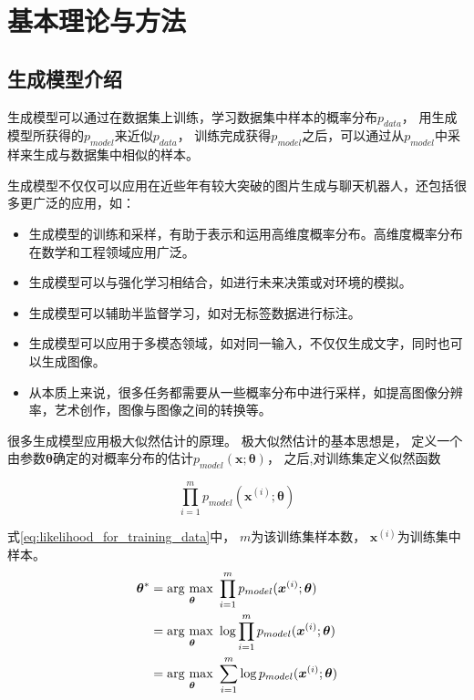 \chapter{基本理论与方法}




\section{生成模型介绍}
生成模型可以通过在数据集上训练，学习数据集中样本的概率分布{$p_{data}$}，
用生成模型所获得的{$p_{model}$}来近似{$p_{data}$}，
训练完成获得{$p_{model}$}之后，可以通过从{$p_{model}$}中采样来生成与数据集中相似的样本。

生成模型不仅仅可以应用在近些年有较大突破的图片生成与聊天机器人，还包括很多更广泛的应用{ {\cite{goodfellow2016nips}}}，如：

\begin{itemize}
    \item 生成模型的训练和采样，有助于表示和运用高维度概率分布。高维度概率分布在数学和工程领域应用广泛。
    \item 生成模型可以与强化学习相结合，如进行未来决策或对环境的模拟。
    \item 生成模型可以辅助半监督学习，如对无标签数据进行标注。
    \item 生成模型可以应用于多模态领域，如对同一输入，不仅仅生成文字，同时也可以生成图像。
    \item 从本质上来说，很多任务都需要从一些概率分布中进行采样，如提高图像分辨率，艺术创作，图像与图像之间的转换等。
\end{itemize}

很多生成模型应用极大似然估计的原理。
极大似然估计的基本思想是，
定义一个由参数{$\bm{\theta}$}确定的对概率分布的估计{$p_{model}(\bm{x};\bm{\theta})$}，
之后,对训练集定义似然函数

\begin{equation}
    \label{eq:likelihood_for_training_data}
    \prod_{i=1}^{m}{p_{model}({\bm{x}}^{(i)};\bm{\theta})}
\end{equation}


式{\ref{eq:likelihood_for_training_data}}中，
{$m$}为该训练集样本数，
{$\bm{x}^{(i)}$}为训练集中样本。
\begin{align}
    \bm{\theta}^{*}
        & = \argmax_{\bm{\theta}}{\prod_{i=1}^{m}{p_{model}({\bm{x}}^{(i)};\bm{\theta})}} \label{eq:theta_star_max_1} \\
        & = \argmax_{\bm{\theta}}{\log{\prod_{i=1}^{m}{p_{model}({\bm{x}}^{(i)};\bm{\theta})}}} \label{eq:theta_star_max_2} \\
        & = \argmax_{\bm{\theta}}{{\sum_{i=1}^{m}{\log p_{model}({\bm{x}}^{(i)};\bm{\theta})}}} \label{eq:theta_star_max_3}  
\end{align}


